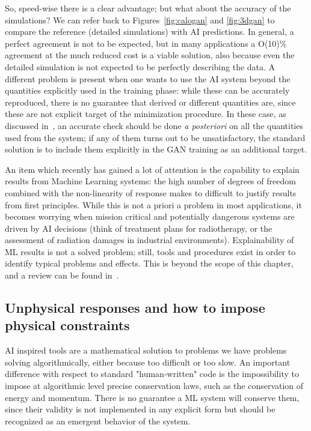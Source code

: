 So, speed-wise there is a clear advantage; but what about the accuracy of the simulations? 
We can refer back to Figures~\ref{fig:calogan} and \ref{fig:3dgan} to compare the reference (detailed simulations) with AI predictions. In general, a perfect agreement is not to be expected, but in many applications a O(10)\% agreement at the much reduced cost is a viable solution, also because even the detailed simulation is not expected to be perfectly describing the data. A different problem is present when one wants to use the AI system beyond the quantities explicitly used in the training phase: while these can be accurately reproduced, there is no guarantee that derived or different quantities are, since these are not explicit target of the minimization procedure. In these case, as discussed in~\cite{Paganini2018}, an accurate check should be done \emph{a posteriori} on all the quantities used from the system; if any of them turns out to be unsatisfactory, the standard solution is to include them explicitly in the GAN training as an additional target.

An item which recently has gained a lot of attention is the capability to explain results from Machine Learning systems: the high number of degrees of freedom combined with the non-linearity of response makes to difficult to justify results from first principles. While this is not a priori a problem in most applications, it becomes worrying when mission critical and potentially dangerous systems are driven by AI decisions (think of treatment plans for radiotherapy, or the assessment of radiation damages in industrial environments). Explainability of ML results is not a solved problem;  still, tools and procedures exist in order to identify typical problems and effects. This is beyond the scope of this chapter, and a review can be found  in~\cite{Linardatos2021}. 


\subsection{Unphysical responses and how to impose physical constraints}
\label{subsec:physical}
AI inspired tools are a mathematical solution to problems we have problems solving algorithmically, either because too difficult or too slow.
An important difference with respect to standard "human-written" code is the impossibility to impose at algorithmic level precise conservation laws, such as the conservation of energy and momentum.
There is no guarantee a ML system will conserve them, since their validity is not implemented in any explicit form but should be recognized  as an emergent behavior of the system.

